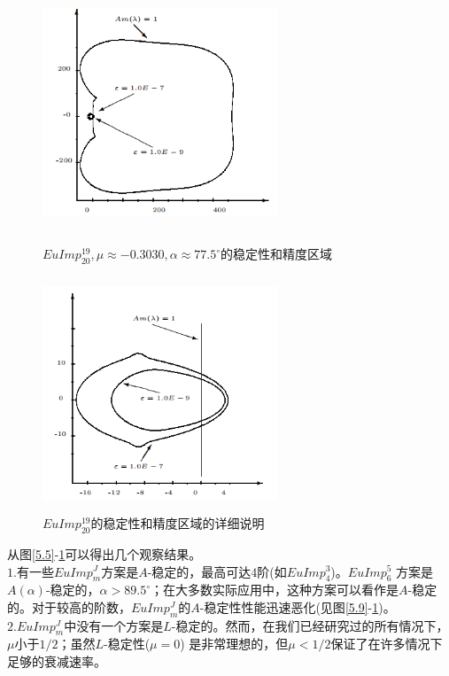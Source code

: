 \documentclass[12pt,a4paper]{article}
\begin{document}
\begin{figure}[htbp]
	{
		\begin{minipage}{6cm}
			\centering
			\includegraphics[width=7cm,height=7cm]{./figures/11.png}
			\caption{$EuImp_{20}^{19},\mu \approx -0.3030, \alpha \approx 77.5^{\circ}$的稳定性和精度区域}
			\label{5.11}
		\end{minipage}
	}
	{
		\begin{minipage}{6cm}
			\centering
			\includegraphics[width=7cm,height=7cm]{./figures/12.png}
			\caption{$EuImp_{20}^{19}$的稳定性和精度区域的详细说明}
			\label{5.12}
		\end{minipage}
	}
\end{figure}
从图\ref{5.5}-\ref{5.12}可以得出几个观察结果。\\

$1$.有一些$EuImp^{J}_{m}$方案是$A$-稳定的，最高可达$4$阶(如$EuImp^3_4$)。$EuImp^5_6$ 方案是$A(\alpha)$-稳定的，$\alpha>89.5^{\circ}$；在大多数实际应用中，这种方案可以看作是$A$-稳定的。对于较高的阶数，$EuImp^{J}_{m}$的$A$-稳定性性能迅速恶化(见图\ref{5.9}-\ref{5.12})。\\

$2$.$EuImp^{J}_{m}$中没有一个方案是$L$-稳定的。然而，在我们已经研究过的所有情况下，$\mu$小于$1/2$；虽然$L$-稳定性($\mu=0$) 是非常理想的，但$\mu<1/2$保证了在许多情况下足够的衰减速率。\\
\end{document}
